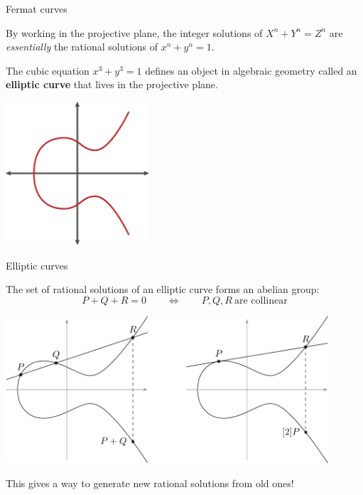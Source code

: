 \documentclass[10pt]{beamer}
\theoremstyle{definition}
\begin{document}
\begin{frame}[t]{Fermat curves}

By working in the projective plane, the integer solutions of $ X^n + Y^n = Z^n $ are \emph{essentially} the rational solutions of $ x^n + y^n = 1 $.

\vspace{0.5cm} The cubic equation $ x^3 + y^3 = 1 $ defines an object in algebraic geometry called an \textbf{elliptic curve} that lives in the projective plane.

\vspace{0.5cm}

\begin{center}
\includegraphics[width=0.4\textwidth]{ellipticcurve.png}
\end{center}

\end{frame}

\begin{frame}[t]{Elliptic curves}

The set of rational solutions of an elliptic curve forms an abelian group:
$$ P + Q + R = 0 \qquad \iff \qquad P, Q, R \ \text{are collinear} $$

\begin{center}
\includegraphics[width=0.9\textwidth]{grouplaw.png}
\end{center}

This gives a way to generate new rational solutions from old ones!

\end{frame}
\end{document}
